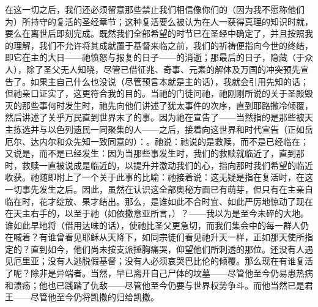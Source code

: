 在这一切之后，我们还必须留意那些禁止我们相信像你们的（因为我不愿称他们为）所持守的复活的圣经章节；这种复活要么被认为在人一获得真理的知识时就，要么在离世后即刻完成。既然我们全部希望的时节已在圣经中确定了，并且按照我的理解，我们不允许将其成就置于基督来临之前，我们的祈祷便指向今世的终结，即它在主的大日——祂愤怒与报复的日子——的消逝；那最后的日子，隐藏（于众人），除了圣父无人知晓，尽管已借征兆、奇事、元素的解体及万国的冲突预先宣告了。如果主自己什么也没说（尽管预言本就是主的话），我就会引用先知的话；但祂亲口证实了，这更符合我的目的。当祂的门徒问祂，祂刚刚所说的关于圣殿毁灭的那些事何时发生时，祂先向他们讲述了犹太事件的次序，直到耶路撒冷倾覆，然后讲述了关乎万民直到世界末了的事。因为祂在宣告了——当然指的是那些被天主拣选并与以色列遗民一同聚集的人——之后，接着向这世界和时代宣告（正如岳厄尔、达内尔和众先知一致同意的）：。祂说：祂说的是救赎，而不是已经临在；又说是，而不是已经发生：因为当那些事发生时，我们的救赎就临近了，直到那时，救赎一直被说成是临近的，以提升并激动我们的心，指向那时我们希望的临近收获。祂随即附上了一个关于此事的比喻：祂接着说：这无疑是指在复活时，在这一切事先发生之后。因此，虽然在认识这全部奥秘方面已有萌芽，但只有在主亲自临在时，花才绽放、果才结出。那么，是谁如此不合时宜、如此严厉地惊动了现在在天主右手的，以至于祂（如依撒意亚所言，）？——我以为是至今未碎的大地。谁如此早地将（借用达味的话），使祂比圣父更急切，而我们集会中的每一群人仍在喊着？有谁曾看见耶稣从天降下，如同宗徒们看见祂升天一样，正如那天使所指定的？直到如今，他们尚未按支派捶胸痛哭，仰望他们所刺透的那位。还没有人遇见厄里亚；没有人逃脱假基督；没有人必须哀哭巴比伦的倾覆。那么现在有谁复活了呢？除非是异端者。当然，早已离开自己尸体的坟墓——尽管他至今仍易患热病和溃疡；他也已践踏了仇敌——尽管他至今仍要与世界权势争斗。而他当然已是君王——尽管他至今仍将凯撒的归给凯撒。\par

